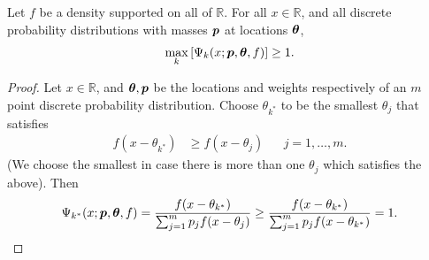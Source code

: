 		\begin{lemma}
		\label{lem:maxkGamma}
		Let $f$ be a density supported on all of $\mathbb{R}$. For all $x \in \mathbb{R}$, and all discrete probability distributions with masses ${\bm{{p}}}$ at locations ${\bm{{\theta}}}$,
			\begin{equation}
				\max_k \left[ \Psi_k(x;{\bm{{p}}},{\bm{{\theta}}},f) \right] \geq 1.
			\end{equation}
		\end{lemma}	
		\begin{proof}
			Let $x \in \mathbb{R}$, and ${\bm{{\theta}}},{\bm{{p}}}$ be the locations and weights respectively of an $m$ point discrete probability distribution. Choose $\theta_{k^*}$ to be the smallest $\theta_j$ that satisfies
			\begin{align}
				f(x - \theta_{k^*}) &\geq f(x - \theta_j) && j = 1, \dots, m.
			\end{align}
			(We choose the smallest in case there is more than one $\theta_j$ which satisfies the above). Then
			\begin{equation}
				\Psi_{k^*}(x;{\bm{{p}}},{\bm{{\theta}}},f) = \frac{f(x - \theta_{k^*})}{\sum_{j=1}^m p_j f(x - \theta_j)} \geq \frac{f(x - \theta_{k^*})}{\sum_{j=1}^m p_j f(x - \theta_{k^*})} = 1.
			\end{equation}
		\end{proof}




